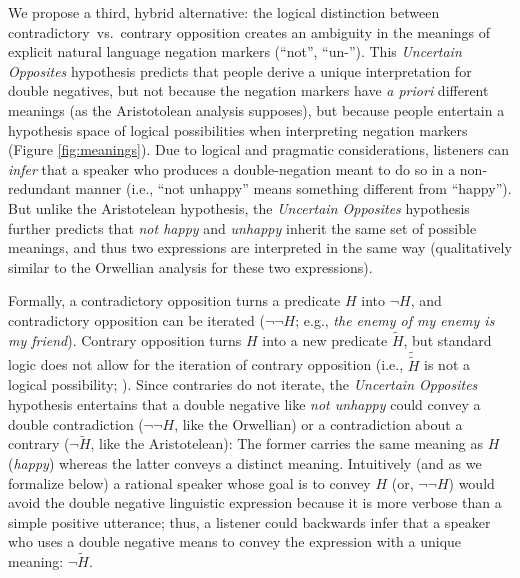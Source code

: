 \documentclass[floatsintext,doc]{apa6}
\begin{document}
We propose a third, hybrid alternative: the logical distinction between contradictory~vs.~contrary opposition creates an ambiguity in the meanings of explicit natural language negation markers (\enquote{not}, \enquote{un-}). %
This \emph{Uncertain Opposites} hypothesis predicts that people derive a unique interpretation for double negatives, but not because the negation markers have \emph{a priori} different meanings (as the Aristotolean analysis supposes), but because people entertain a hypothesis space of logical possibilities when interpreting negation markers (Figure \ref{fig:meanings}). 
Due to logical and pragmatic considerations, listeners can \emph{infer} that a speaker who produces a double-negation meant to do so in a non-redundant manner (i.e., ``not unhappy'' means something different from ``happy''). 
But unlike the Aristotelean hypothesis, the \emph{Uncertain Opposites} hypothesis further predicts that \emph{not happy} and \emph{unhappy} inherit the same set of possible meanings, and thus two expressions are interpreted in the same way (qualitatively similar to the Orwellian analysis for these two expressions).

Formally, a contradictory opposition turns a predicate $H$ into $\neg H$, and contradictory opposition can be iterated ($\neg \neg H$; e.g., \emph{the enemy of my enemy is my friend}).
Contrary opposition turns $H$ into a new predicate $\tilde{H}$, but standard logic does not allow for the iteration of contrary opposition (i.e., $\tilde{\tilde{H}}$ is not a logical possibility;  ).
Since contraries do not iterate, the \emph{Uncertain Opposites} hypothesis entertains that a double negative like \emph{not unhappy} could convey a double contradiction ($\neg \neg H$, like the Orwellian) or a contradiction about a contrary ($\neg \tilde{H}$, like the Aristotelean): The former carries the same meaning as $H$ (\emph{happy}) whereas the latter conveys a distinct meaning. 
Intuitively (and as we formalize below) a rational speaker whose goal is to convey $H$ (or, $\neg \neg H$) would avoid the double negative linguistic expression because it is more verbose than a simple positive utterance; thus, a listener could backwards infer that a speaker who uses a double negative means to convey the expression with a unique meaning: $\neg \tilde{H}$.
\end{document}

